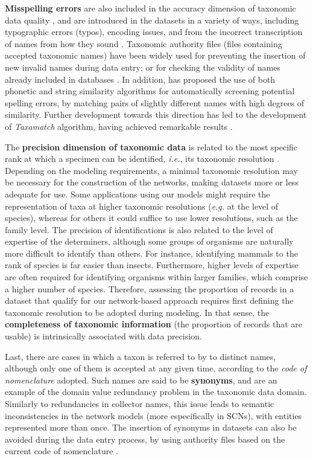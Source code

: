 \textbf{Misspelling errors} are also included in the accuracy dimension of taxonomic data quality \cite{Veiga2014}, and are introduced in the datasets in a variety of ways, including typographic errors (typos), encoding issues, and from the incorrect transcription of names from how they sound \cite{Dalcin2005}.
Taxonomic authority files (files containing accepted taxonomic names) have been widely used for preventing the insertion of new invalid names during data entry; or for checking the validity of names already included in databases \cite{Chapman2005a}.
In addition,  has proposed the use of both phonetic and string similarity algorithms for automatically screening potential spelling errors, by matching pairs of slightly different names with high degrees of similarity.
Further development towards this direction has led to the development of \textit{Taxamatch} algorithm, having achieved remarkable results \cite{Rees2014a}. 

The \textbf{precision dimension of taxonomic data} is related to the most specific rank at which a specimen can be identified, \textit{i.e.}, its taxonomic resolution \cite{Veiga2014}.
Depending on the modeling requirements, a minimal taxonomic resolution may be necessary for the construction of the networks, making datasets more or less adequate for use.
Some applications using our models might require the representation of taxa at higher taxonomic resolutions  (\textit{e.g.} at the level of species), whereas for others it could suffice to use lower resolutions, such as the family level.
The precision of identifications is also related to the level of expertise of the determiners, although some groups of organisms are naturally more difficult to identify than others.
For instance, identifying mammals to the rank of species is far easier than insects.
Furthermore, higher levels of expertise are often required for identifying organisms within larger families, which comprise a higher number of species.
%
Therefore, assessing the proportion of records in a dataset that qualify for our network-based approach requires first defining the taxonomic resolution to be adopted during modeling.
In that sense, the \textbf{completeness of taxonomic information} (the proportion of records that are usable) is intrinsically associated with data precision.

Last, there are cases in which a taxon is referred to by to distinct names, although only one of them is accepted at any given time, according to the \textit{code of nomenclature} adopted.
Such names are said to be \textbf{synonyms}, and are an example of the domain value redundancy problem in the taxonomic data domain.
Similarly to redundancies in collector names, this issue leads to semantic inconsistencies in the network models (more especifically in SCNs), with entities represented more than once.
The insertion of synonyms in datasets can also be avoided during the data entry process, by using authority files based on the current code of nomenclature \cite{Veiga2014}. 













